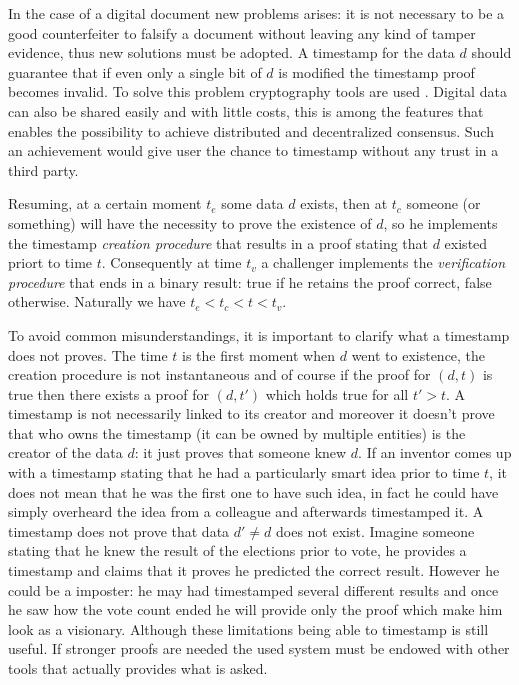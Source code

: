 In the case of a digital document new problems arises: it is not necessary to be a good counterfeiter to falsify a document without leaving any kind of tamper evidence, thus new solutions must be adopted. A timestamp for the data $d$ should guarantee that if even only a single bit of $d$ is modified the timestamp proof becomes invalid. To solve this problem cryptography tools are used \cite{Haber97securenames}. Digital data can also be shared easily and with little costs, this is among the features that enables the possibility to achieve distributed and decentralized consensus. Such an achievement would give user the chance to timestamp without any trust in a third party.

Resuming, at a certain moment $t_e$ some data $d$ exists, then at $t_c$ someone (or something) will have the necessity to prove the existence of $d$, so he implements the timestamp \textit{creation procedure} that results in a proof stating that $d$ existed priort to time $t$. Consequently at time $t_v$ a challenger implements the \textit{verification procedure} that ends in a binary result: true if he retains the proof correct, false otherwise. Naturally we have $t_e<t_c<t<t_v$.

To avoid common misunderstandings, it is important to clarify what a timestamp does not proves. The time $t$ is the first moment when $d$ went to existence, the creation procedure is not instantaneous and of course if the proof for $(d,t)$ is true then there exists a proof for $(d,t')$ which holds true for all $t'>t$. A timestamp is not necessarily linked to its creator and moreover it doesn't prove that who owns the timestamp (it can be owned by multiple entities) is the creator of the data $d$: it just proves that someone knew $d$. If an inventor comes up with a timestamp stating that he had a particularly smart idea prior to time $t$, it does not mean that he was the first one to have such idea, in fact he could have simply overheard the idea from a colleague and afterwards timestamped it. A timestamp does not prove that data $d' \neq d$ does not exist. Imagine someone stating that he knew the result of the elections prior to vote, he provides a timestamp and claims that it proves he predicted the correct result. However he could be a imposter: he may had timestamped several different results and once he saw how the vote count ended he will provide only the proof which make him look as a visionary.
Although these limitations being able to timestamp is still useful. If stronger proofs are needed the used system must be endowed with other tools that actually provides what is asked. 

